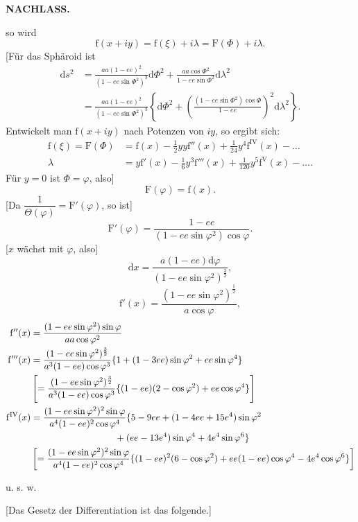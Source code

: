 \par\clearpage
{}\hfill{\small\textbf{NACHLASS.}}\hfill\null\par\medskip
\noindent so wird
\[\mathrm f(x+iy)=\mathrm f(\xi)+i\lambda=\mathrm F(\Phi)+i\lambda.\]
[Für das Sphäroid ist
\[
\begin{aligned}
\mathrm ds^2&=\frac{aa(1-ee)^2}{(1-ee\sin\Phi^2)^3}\mathrm d\Phi^2+\frac{aa\cos\Phi^2}{1-ee\sin\Phi^2}\mathrm d\lambda^2\\
&=\frac{aa(1-ee)^2}{(1-ee\sin\Phi^2)^3}\left\{\mathrm d\Phi^2+\left(\frac{(1-ee\sin\Phi^2)\cos\Phi}{1-ee}\right)^2\mathrm d\lambda^2\right\}.
\end{aligned}
\]
Entwickelt man \(\mathrm f(x+iy)\) nach Potenzen von \(iy\), so ergibt sich:
\[
\begin{aligned}
\mathrm f(\xi)=\mathrm F(\Phi)&=\mathrm f(x)-\tfrac12yy\mathrm f''(x)+\tfrac1{24}y^4\mathrm f^{\mathrm{IV}}(x)-\ldots\\
\lambda&=y\mathrm f'(x)-\tfrac16y^3\mathrm f'''(x)+\tfrac1{120}y^5\mathrm f^{\mathrm V}(x)-\ldots.
\end{aligned}
\]
Für \(y=0\) ist \(\Phi=\varphi\), also]
\[\mathrm F(\varphi)=\mathrm f(x).\]
[Da \(\dfrac1{\Theta(\varphi)}=\mathrm F'(\varphi)\), so ist]
\[\mathrm F'(\varphi)=\frac{1-ee}{(1-ee\sin\varphi^2)\cos\varphi}.\]
[\(x\) wächst mit \(\varphi\), also]
\[\mathrm dx=\frac{a(1-ee)\mathrm d\varphi}{(1-ee\sin\varphi^2)^{\frac32}},\]
\[\mathrm f'(x)=\frac{(1-ee\sin\varphi^2)^{\frac12}}{a\cos\varphi},\]
\[
\begin{aligned}
\mathrm f''(x)&=\frac{(1-ee\sin\varphi^2)\sin\varphi}{aa\cos\varphi^2}\\
\mathrm f'''(x)&=\frac{(1-ee\sin\varphi^2)^{\frac32}}{a^3(1-ee)\cos\varphi^3}\{1+(1-3ee)\sin\varphi^2+ee\sin\varphi^4\}\\
&\left[=\frac{(1-ee\sin\varphi^2)^{\frac32}}{a^3(1-ee)\cos\varphi^3}\{(1-ee)(2-\cos\varphi^2)+ee\cos\varphi^4\}\right]\\
\mathrm f^{\mathrm{IV}}(x)&=\frac{(1-ee\sin\varphi^2)^2\sin\varphi}{a^4(1-ee)^2\cos\varphi^4}\{5-9ee+(1-4ee+15e^4)\sin\varphi^2\\
&\hspace{32mm}+(ee-13e^4)\sin\varphi^4+4e^4\sin\varphi^6\}\\
&\left[=\frac{(1-ee\sin\varphi^2)^2\sin\varphi}{a^4(1-ee)^2\cos\varphi^4}\{(1-ee)^2(6-\cos\varphi^2)+ee(1-ee)\cos\varphi^4-4e^4\cos\varphi^6\}\right]
\end{aligned}
\]
{\centering u. s. w.\par}
[Das Gesetz der Differentiation ist das folgende.]

